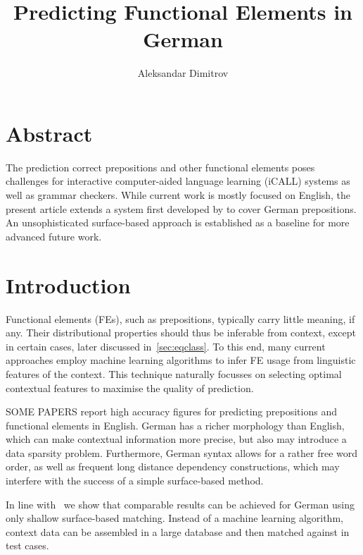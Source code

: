 \documentclass[draft,12pt]{article}
\author{Aleksandar Dimitrov}
\title{Predicting Functional Elements in German}
\begin{document}


\maketitle

\newcommand{\pair}[1]{\ensuremath{\langle #1 \rangle}}

\tableofcontents

\section{Abstract}

The prediction correct prepositions and other functional elements poses challenges
for interactive computer-aided language learning (iCALL) systems as well as
grammar checkers. While current work is mostly focused on English, the present
article extends a system first developed by \citep{elghafariETAL2010} to cover
German prepositions. An unsophisticated surface-based approach is established as
a baseline for more advanced future work.

\section{Introduction}

Functional elements (FEs), such as prepositions, typically carry little meaning, if
any. Their distributional properties should thus be inferable from context,
except in certain cases, later discussed in~\ref{sec:eqclass}.
To this end, many current approaches employ machine learning algorithms to infer
FE usage from linguistic features of the context. This technique naturally
focusses on selecting optimal contextual features to maximise the quality of
prediction.

SOME PAPERS %
report high accuracy figures for predicting prepositions and functional elements
in English. German has a richer morphology than English, which can make
contextual information more precise, but also may introduce a data sparsity
problem. Furthermore, German syntax allows for a rather free word order, as well
as frequent long distance dependency constructions, which may interfere with the
success of a simple surface-based method.

In line with~\citep{elghafariETAL2010} we show that comparable results can be
achieved for German using only shallow surface-based matching. Instead of a
machine learning algorithm, context data can be assembled in a large database
and then matched against in test cases.
\end{document}

